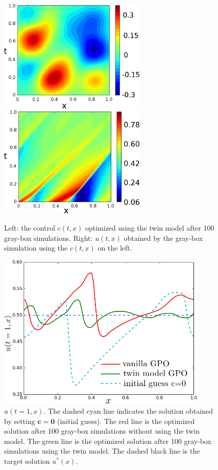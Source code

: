 \documentclass[a4paper,onecolumn]{article}
\theoremstyle{remark}
\begin{document}
\begin{figure}[H]\begin{center}
    \includegraphics[width=7cm]{opt_source.png}
    \includegraphics[width=7cm]{LD_utx.png}
    \caption{Left: the control $c(t,x)$ optimized using the twin model after
    100 gray-box simulations. Right: $u(t,x)$ obtained by the gray-box simulation using the 
    $c(t,x)$ on the left.}
    \label{fig:opt_source}
\end{center}
\end{figure}


\begin{figure}[H]\begin{center}
    \includegraphics[width=10cm]{finalutx.png}
    \caption{$u(t=1,x)$. The dashed cyan line indicates the solution obtained by setting
    $\mathbf{c}=\mathbf{0}$ (initial guess). The red line is the optimized solution 
    after 100 gray-box simulations without using the twin model. The green line is the optimized
    solution after 100 gray-box simulations using the twin model. The dashed black line is
    the target solution $u^*(x)$.}
    \label{fig:finalutx}
\end{center}
\end{figure}
\end{document}
